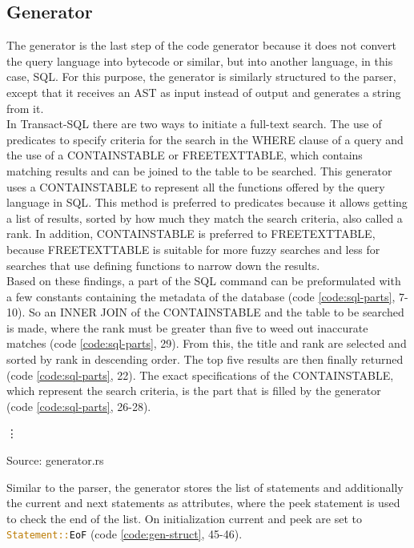 \subsection{Generator}
The generator is the last step of the code generator because it does not convert the query language into bytecode or similar, but into another language, in this case, \ac{SQL}. For this purpose, the generator is similarly structured to the parser, except that it receives an \ac{AST} as input instead of output and generates a string from it.\\
In Transact-\ac{SQL} there are two ways to initiate a full-text search. The use of predicates to specify criteria for the search in the WHERE clause of a query and the use of a CONTAINSTABLE or FREETEXTTABLE, which contains matching results and can be joined to the table to be searched. This generator uses a CONTAINSTABLE to represent all the functions offered by the query language in \ac{SQL}. This method is preferred to predicates because it allows getting a list of results, sorted by how much they match the search criteria, also called a rank. In addition, CONTAINSTABLE is preferred to FREETEXTTABLE, because FREETEXTTABLE is suitable for more fuzzy searches and less for searches that use defining functions to narrow down the results.\\
Based on these findings, a part of the SQL command can be preformulated with a few constants containing the metadata of the database (code \ref{code:sql-parts}, 7-10). So an INNER JOIN of the CONTAINSTABLE and the table to be searched is made, where the rank must be greater than five to weed out inaccurate matches (code \ref{code:sql-parts}, 29). From this, the title and rank are selected and sorted by rank in descending order. The top five results are then finally returned (code \ref{code:sql-parts}, 22). The exact specifications of the CONTAINSTABLE, which represent the search criteria, is the part that is filled by the generator (code \ref{code:sql-parts}, 26-28).
\begin{codeenv}
    \label{code:sql-parts}
    
    \vdots
    
    \centerline{Source: generator.rs}
\end{codeenv}
Similar to the parser, the generator stores the list of statements and additionally the current and next statements as attributes, where the peek statement is used to check the end of the list. On initialization current and peek are set to \lstinline[language=Rust]$Statement::EoF$ (code \ref{code:gen-struct}, 45-46).
